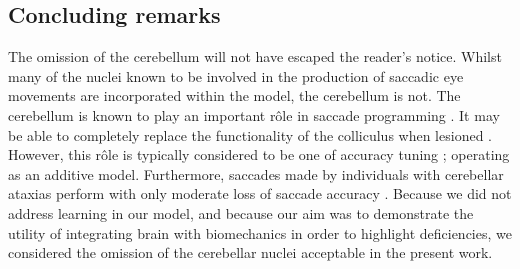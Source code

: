 \documentclass{frontiersSCNS}
\begin{document}


\subsection{Concluding remarks}


The omission of the cerebellum will not have escaped the reader's
notice.  Whilst many of the nuclei known to be involved in the
production of saccadic eye movements are incorporated within the
model, the cerebellum is not. The cerebellum is known to play an
important r\^ole in saccade programming
\citep{dean_learning_1994, schweighofer_model_1996,quaia_extent_2000,kleine_saccade-related_2003}.
It may be able to completely replace the functionality of the
colliculus when
lesioned \citep{aizawa_reversible_1998,lefevre_distributed_1998}.
However, this r\^ole is typically considered to be one of accuracy
tuning
\citep{barash_saccadic_1999,dean_learning_1994}; operating as an additive
model. Furthermore, saccades made by individuals with cerebellar
ataxias perform with only moderate loss of saccade accuracy
\citep{barash_saccadic_1999,federighi_differences_2011}. Because we
did not address learning in our model, and because our aim was to
demonstrate the utility of integrating brain with biomechanics in
order to highlight deficiencies, we considered the omission of the
cerebellar nuclei acceptable in the present work.
\end{document}
